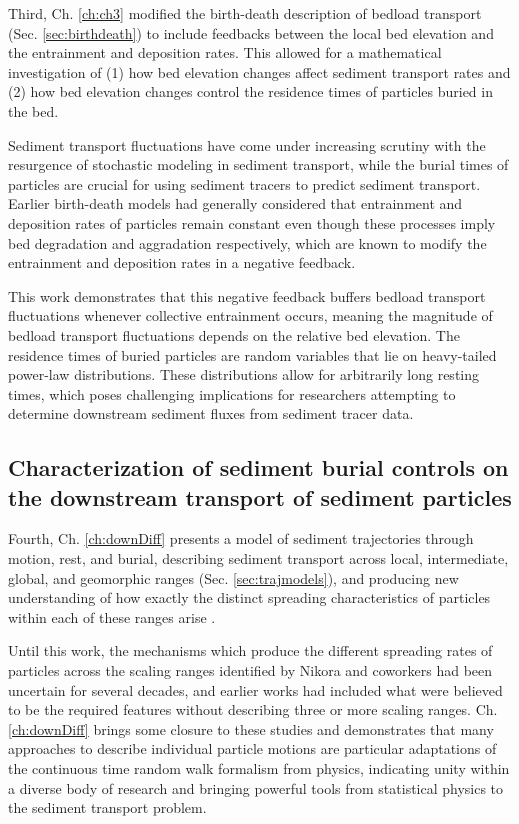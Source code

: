 Third, Ch. \ref{ch:ch3} modified the birth-death description of bedload transport (Sec. \ref{sec:birthdeath}) to include feedbacks between the local bed elevation and the entrainment and deposition rates.
This allowed for a mathematical investigation of (1) how bed elevation changes affect sediment transport rates and (2) how bed elevation changes control the residence times of particles buried in the bed.

Sediment transport fluctuations have come under increasing scrutiny with the resurgence of stochastic modeling in sediment transport, while the burial times of particles are crucial for using sediment tracers to predict sediment transport.
Earlier birth-death models had generally considered that entrainment and deposition rates of particles remain constant even though these processes imply bed degradation and aggradation respectively, which are known to modify the entrainment and deposition rates in a negative feedback.

This work demonstrates that this negative feedback buffers bedload transport fluctuations whenever collective entrainment occurs, meaning the magnitude of bedload transport fluctuations depends on the relative bed elevation. The residence times of buried particles are random variables that lie on heavy-tailed power-law distributions. These distributions allow for arbitrarily long resting times, which poses challenging implications for researchers attempting to determine downstream sediment fluxes from sediment tracer data. 

\subsection{Characterization of sediment burial controls on the downstream transport of sediment particles}

Fourth, Ch. \ref{ch:downDiff} presents a model of sediment trajectories through motion, rest, and burial, describing sediment transport across local, intermediate, global, and geomorphic ranges (Sec. \ref{sec:trajmodels}), and producing new understanding of how exactly the distinct spreading characteristics of particles within each of these ranges arise \citep[e.g][]{Pretzlav2021}.

Until this work, the mechanisms which produce the different spreading rates of particles across the scaling ranges identified by Nikora and coworkers had been uncertain for several decades, and earlier works had included what were believed to be the required features without describing three or more scaling ranges.
Ch. \ref{ch:downDiff} brings some closure to these studies and demonstrates that many approaches to describe individual particle motions are particular adaptations of the continuous time random walk formalism from physics, indicating unity within a diverse body of research and bringing powerful tools from statistical physics to the sediment transport problem.

